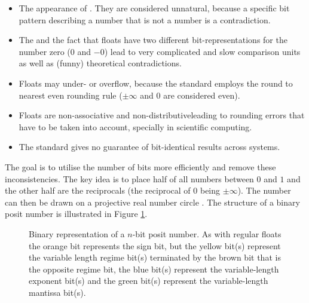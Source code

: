 \documentclass{article}
\theoremstyle{plain} %
\theoremstyle{convention} %
\theoremstyle{remark} %
\numberwithin{equation}{section}
\begin{document}
\begin{itemize}
    \item The appearance of . They are considered unnatural, because a specific bit pattern describing a number that is not a number is a contradiction.
    \item The  and the fact that floats have two different bit-representations for the number zero ($0$ and $-0$) lead to very complicated and slow comparison units as well as (funny) theoretical contradictions\footnotemark.


    \item Floats may under- or overflow, because the standard employs the round to nearest even rounding rule ($\pm \infty$ and $0$ are considered even).
    \item Floats are non-associative and non-distributive\footnotemark leading to rounding errors that have to be taken into account, specially in scientific computing.
    \item The standard gives no guarantee of bit-identical results across systems.
\end{itemize}



The goal is to utilise the number of bits more efficiently and remove these inconsistencies. The key idea is to place half of all numbers between $0$ and $1$ and the other half are the reciprocals (the reciprocal of $0$ being $\pm \infty$). The number can then be drawn on a projective real number circle \cite{gustafson2017}. The structure of a binary posit number is illustrated in Figure \ref{fig:posit}.

\begin{figure}[H]
  \caption{Binary representation of a $n$-bit posit number. As with regular floats the \textcolor{corange}{orange} bit represents the \textcolor{corange}{sign bit}, but the \textcolor{cyellow}{yellow} bit(s) represent the variable length \textcolor{cyellow}{regime bit(s)} terminated by the \textcolor{cbrown}{brown} bit that is the \textcolor{cbrown}{opposite regime bit}, the \textcolor{cblue}{blue} bit(s) represent the variable-length \textcolor{cblue}{exponent bit(s)} and the \textcolor{cgreen}{green} bit(s) represent the variable-length \textcolor{cgreen}{mantissa bit(s)}.}
  \label{fig:posit}
\end{figure}
\end{document}
